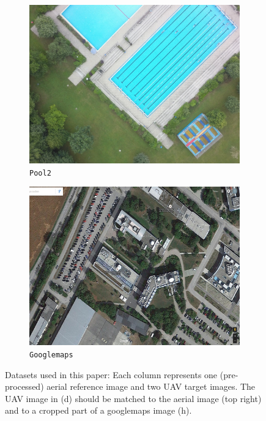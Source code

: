 \begin{figure}[tbp]
\begin{subfigure}[b]{0.243\textwidth}
           \includegraphics[width=\textwidth]{figures_dataset/swimmingpool_org_uav2.jpg}
           \caption{\texttt{Pool2}}
       \end{subfigure}
       \hfill
       \begin{subfigure}[b]{0.243\textwidth}  
           \centering 
           \includegraphics[width=\textwidth]{figures_dataset/eoc_org_gmaps.jpg}
           \caption{\texttt{Googlemaps}}
       \end{subfigure}
       \caption{Datasets used in this paper: Each column represents one (pre-processed) aerial reference image and two UAV target images. The UAV image in (d) should be matched to the aerial image (top right) and to a cropped part of a googlemaps image (h).}
\label{fig:datasets} 
\end{figure}
